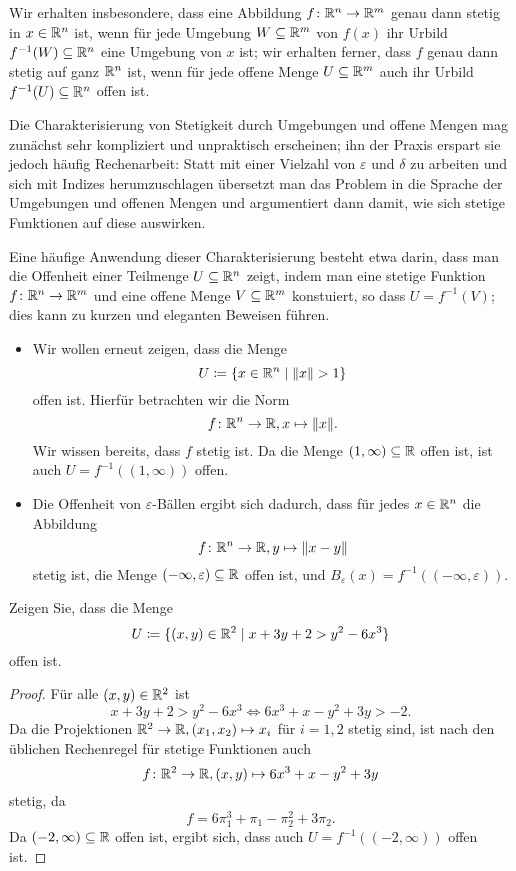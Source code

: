 \documentclass[a4paper,10pt]{article}
\begin{document}
\begin{bem}
 Wir erhalten insbesondere, dass eine Abbildung $f \colon \mathbb{R}^n \to \mathbb{R}^m$ genau dann stetig in $x \in \mathbb{R}^n$ ist, wenn für jede Umgebung $W \subseteq \mathbb{R}^m$ von $f(x)$ ihr Urbild $f^{-1}(W) \subseteq \mathbb{R}^n$ eine Umgebung von $x$ ist; wir erhalten ferner, dass $f$ genau dann stetig auf ganz $\mathbb{R}^n$ ist, wenn für jede offene Menge $U \subseteq \mathbb{R}^m$ auch ihr Urbild $f^{-1}(U) \subseteq \mathbb{R}^n$ offen ist.
\end{bem}


Die Charakterisierung von Stetigkeit durch Umgebungen und offene Mengen mag zunächst sehr kompliziert und unpraktisch erscheinen; ihn der Praxis erspart sie jedoch häufig Rechenarbeit: Statt mit einer Vielzahl von $\varepsilon$ und $\delta$ zu arbeiten und sich mit Indizes herumzuschlagen übersetzt man das Problem in die Sprache der Umgebungen und offenen Mengen und argumentiert dann damit, wie sich stetige Funktionen auf diese auswirken.


Eine häufige Anwendung dieser Charakterisierung besteht etwa darin, dass man die Offenheit einer Teilmenge $U \subseteq \mathbb{R}^n$ zeigt, indem man eine stetige Funktion $f \colon \mathbb{R}^n \to \mathbb{R}^m$ und eine offene Menge $V \subseteq \mathbb{R}^m$ konstuiert, so dass $U = f^{-1}(V)$; dies kann zu kurzen und eleganten Beweisen führen.


\begin{bsp}
 \begin{itemize}
  \item
   Wir wollen erneut zeigen, dass die Menge
   \[
    U \coloneqq \{x \in \mathbb{R}^n \mid \|x\| > 1\}
   \]
   offen ist. Hierfür betrachten wir die Norm
   \[
    f \colon \mathbb{R}^n \to \mathbb{R}, x \mapsto \|x\|.
   \]
   Wir wissen bereits, dass $f$ stetig ist. Da die Menge $(1,\infty) \subseteq \mathbb{R}$ offen ist, ist auch $U = f^{-1}((1,\infty))$ offen.
  \item
   Die Offenheit von $\varepsilon$-Bällen ergibt sich dadurch, dass für jedes $x \in \mathbb{R}^n$ die Abbildung
   \[
    f \colon \mathbb{R}^n \to \mathbb{R}, y \mapsto \|x-y\|
   \]
   stetig ist, die Menge $(-\infty,\varepsilon) \subseteq \mathbb{R}$ offen ist, und $B_\varepsilon(x) = f^{-1}((-\infty,\varepsilon))$.
 \end{itemize}
\end{bsp}


\begin{question}
 Zeigen Sie, dass die Menge
 \[
  U \coloneqq \{(x,y) \in \mathbb{R}^2 \mid x + 3y + 2 > y^2 - 6x^3 \}
 \]
 offen ist.
\end{question}
\begin{proof}
 Für alle $(x,y) \in \mathbb{R}^2$ ist
 \[
  x + 3y + 2 > y^2 - 6x^3
  \Leftrightarrow 6x^3 + x - y^2 + 3y > -2.
 \]
 Da die Projektionen $\mathbb{R}^2 \to \mathbb{R}, (x_1, x_2) \mapsto x_i$ für $i=1,2$ stetig sind, ist nach den üblichen Rechenregel für stetige Funktionen auch
 \[
  f \colon \mathbb{R}^2 \to \mathbb{R}, (x,y) \mapsto 6x^3 + x - y^2 + 3y
 \]
 stetig, da
 \[
  f = 6 \pi_1^3 + \pi_1 - \pi_2^2 + 3 \pi_2.
 \]
 Da $(-2,\infty) \subseteq \mathbb{R}$ offen ist, ergibt sich, dass auch $U = f^{-1}((-2,\infty))$ offen ist.
\end{proof}
\end{document}
